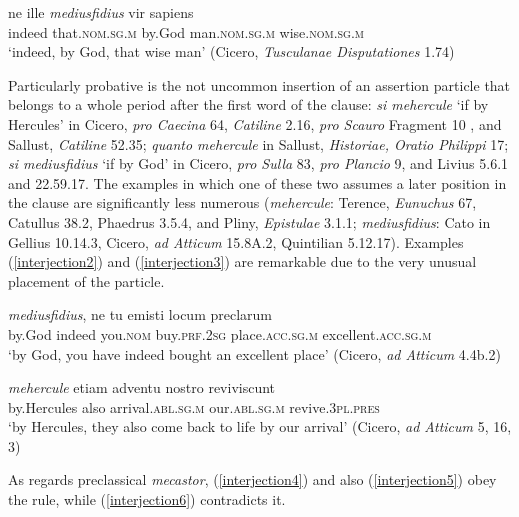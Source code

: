 \begin{exe}
\ex
\gll ne ille \emph{mediusfidius} vir sapiens\\
indeed that.\textsc{nom.sg.m} by.God man.\textsc{nom.sg.m} wise.\textsc{nom.sg.m}\\ 
\trans `indeed, by God, that wise man' (Cicero, \textit{Tusculanae Disputationes} 1.74)
\label{interjection1}
\end{exe}

Particularly probative is the not uncommon insertion of an assertion particle that belongs to a whole period after the first word of the clause: \emph{si mehercule} `if by Hercules' in Cicero, \textit{pro Caecina} 64, \textit{Catiline} 2.16, \textit{pro Scauro} Fragment 10 \citep[246]{Mueller1886}, and Sallust, \textit{Catiline} 52.35; \emph{quanto mehercule} in Sallust, \textit{Historiae, Oratio Philippi} 17; \emph{si mediusfidius} `if by God' in Cicero, \textit{pro Sulla} 83, \textit{pro Plancio} 9, and Livius 5.6.1 and 22.59.17. The examples in which one of these two  assumes a later position in the clause are significantly less numerous (\emph{mehercule}: Terence, \textit{Eunuchus} 67, Catullus 38.2, Phaedrus 3.5.4, and Pliny, \textit{Epistulae} 3.1.1; \emph{mediusfidius}: Cato in Gellius 10.14.3, Cicero, \textit{ad Atticum} 15.8A.2, Quintilian 5.12.17). Examples (\ref{interjection2}) and (\ref{interjection3}) are remarkable due to the very unusual placement of the particle.

\begin{exe}
\ex
\gll \emph{mediusfidius}, ne tu emisti locum preclarum\\
by.God indeed you.\textsc{nom} buy.\textsc{prf.2sg} place.\textsc{acc.sg.m} excellent.\textsc{acc.sg.m}\\
\trans `by God, you have indeed bought an excellent place' (Cicero, \textit{ad Atticum} 4.4b.2)
\label{interjection2}
\end{exe}

\begin{exe}
\ex
\gll \emph{mehercule} etiam adventu nostro reviviscunt\\
by.Hercules also arrival.\textsc{abl.sg.m} our.\textsc{abl.sg.m} revive.\textsc{3pl.pres}\\
\trans `by Hercules, they also come back to life by our arrival' (Cicero, \textit{ad Atticum} 5, 16, 3)
\label{interjection3}
\end{exe}

As regards preclassical \emph{mecastor}, (\ref{interjection4}) and also (\ref{interjection5}) obey the rule, while (\ref{interjection6}) contradicts it.

